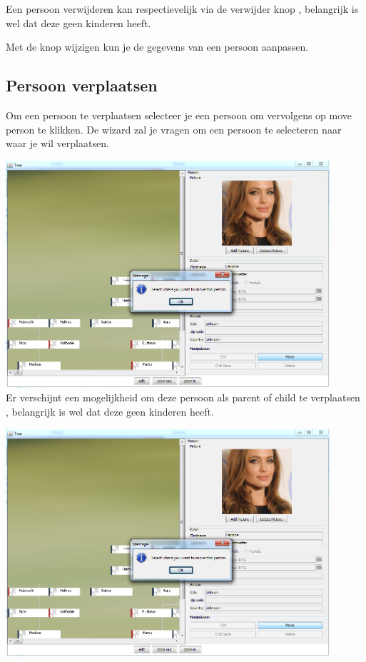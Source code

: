 \documentclass[pdftex,a4paper,12pt,twoside]{report}
\begin{document}
Een persoon verwijderen kan respectievelijk via de verwijder knop , belangrijk is wel dat deze geen kinderen heeft.


Met de knop wijzigen kun je de gegevens van een persoon aanpassen.

\subsection{Persoon verplaatsen}
Om een persoon te verplaatsen selecteer je een persoon om vervolgens op move person te klikken.
De wizard zal je vragen om een persoon te selecteren naar waar je wil verplaatsen.

\includegraphics[width=12cm]{images/moveperson1.png}\\[.5cm]

Er verschijnt een  mogelijkheid om deze persoon als parent of child te verplaatsen , belangrijk is wel dat deze geen kinderen heeft.

\includegraphics[width=12cm]{images/moveperson1.png}\\[.5cm]
\end{document}
